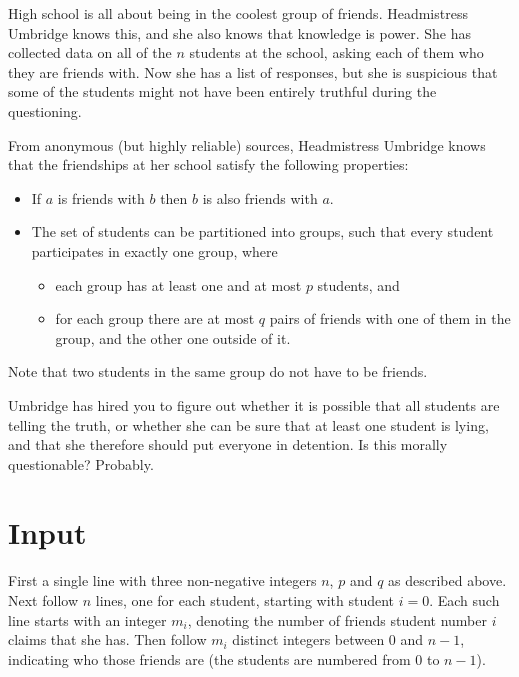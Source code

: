 
\noindent
High school is all about being in the coolest group of friends. Headmistress Umbridge knows this, and she also knows that knowledge is power. She has collected data on all of the $n$ students at the school, asking each of them who they are friends with. Now she has a list of responses, but she is suspicious that some of the students might not have been entirely truthful during the questioning. 

From anonymous (but highly reliable) sources, Headmistress Umbridge knows that the friendships at her school satisfy the following properties:
\begin{itemize}
  \item If $a$ is friends with $b$ then $b$ is also friends with $a$.
  \item The set of students can be partitioned into groups, such that every student participates in exactly one group, where
  \begin{itemize}
    \item each group has at least one and at most $p$ students, and
    \item for each group there are at most $q$ pairs of friends with one of them in the group, and the other one outside of it.
  \end{itemize}
\end{itemize}
\noindent
Note that two students in the same group do not have to be friends.

Umbridge has hired you to figure out whether it is possible that all students are telling the truth, or whether she can be sure that at least one student is lying, and that she therefore should put everyone in detention. Is this morally questionable? Probably. 

\section*{Input}
First a single line with three non-negative integers $n$, $p$ and $q$ as described above. Next follow $n$ lines, one for each student, starting with student $i=0$. Each such line starts with an integer $m_i$, denoting the number of friends student number $i$ claims that she has. Then follow $m_i$ distinct integers between $0$ and $n-1$, indicating who those friends are (the students are numbered from $0$ to $n-1$). 

